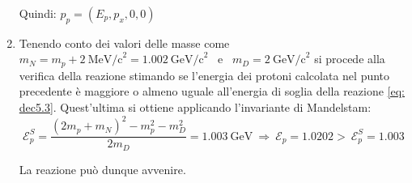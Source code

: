 \documentclass[12pt,twoside,a4]{article}
\begin{document}
\begin{solution}
\begin{enumerate}[label=(\textit{\roman*})]
Quindi: $p_p = (E_p , p_x , 0 , 0)$ 
\item Tenendo conto dei valori delle masse come $m_N = m_p + 2 \ \mathrm{MeV/c}^2 = 1.002 \ \mathrm{GeV/c}^2$ \ e \ $m_D = 2 \ \mathrm{GeV/c}^2$  si procede alla verifica della reazione stimando se l'energia dei protoni calcolata nel punto precedente è maggiore o almeno uguale all'energia di soglia della reazione \ref{eq: dec5.3}. Quest'ultima si ottiene applicando l'invariante di Mandelstam: \begin{equation*}
    \mathcal{E}^S_p = \frac{(2m_p + m_N)^2 - m^2_p - m^2_D}{2 m_D} = 1.003 \ \mathrm{GeV}  \  \Rightarrow  \  \mathcal{E}_p = 1.0202 > \  \mathcal{E}^S_p = 1.003  
\end{equation*}

La reazione può dunque avvenire.
\end{enumerate}
\end{solution}

\end{document}
